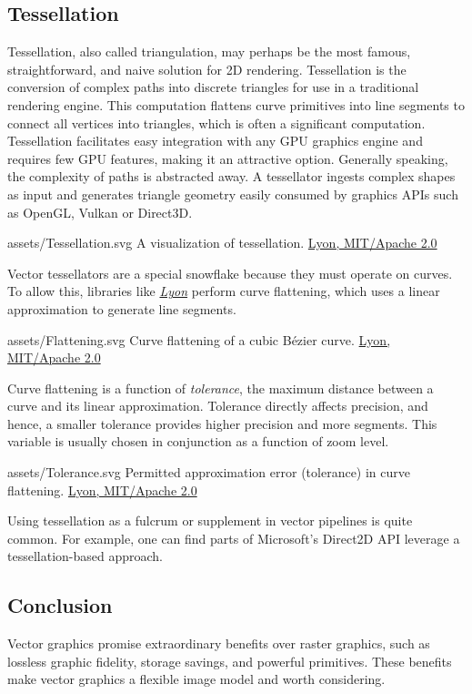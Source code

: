 \subsection{Tessellation}\label{sec:tessellation}
Tessellation, also called triangulation, may perhaps be the most famous, straightforward, and naive solution for 2D rendering. Tessellation is the conversion of complex paths into discrete triangles for use in a traditional rendering engine. This computation flattens curve primitives into line segments to connect all vertices into triangles, which is often a significant computation. Tessellation facilitates easy integration with any GPU graphics engine and requires few GPU features, making it an attractive option. Generally speaking, the complexity of paths is abstracted away. A tessellator ingests complex shapes as input and generates triangle geometry easily consumed by graphics APIs such as OpenGL, Vulkan or Direct3D.\medskip

\svg
{assets/Tessellation.svg}
{A visualization of tessellation.}
{\href{https://github.com/nical/lyon/blob/540a29c3726cdc79ffeb8a7ac3fbc793e63dc87b/crates/geom/src/lib.rs\#L24}{Lyon, MIT/Apache 2.0}}
\medskip

Vector tessellators are a special snowflake because they must operate on curves. To allow this, libraries like \href{https://github.com/nical/lyon}{\textit{Lyon}} perform curve flattening, which uses a linear approximation to generate line segments\cite{Silva18}.\medskip

\smallsvg
{assets/Flattening.svg}
{Curve flattening of a cubic Bézier curve.}
{\href{https://github.com/nical/lyon/blob/540a29c3726cdc79ffeb8a7ac3fbc793e63dc87b/crates/geom/src/lib.rs\#L24}{Lyon, MIT/Apache 2.0}}\medskip

Curve flattening is a function of \textit{tolerance}, the maximum distance between a curve and its linear approximation. Tolerance directly affects precision, and hence, a smaller tolerance provides higher precision and more segments. This variable is usually chosen in conjunction as a function of zoom level.\medskip

\widesvg
{assets/Tolerance.svg}
{Permitted approximation error (tolerance) in curve flattening.}
{\href{https://github.com/nical/lyon/blob/1c391badb70f8d5d23b45ecb4577f54a5c777122/crates/tessellation/src/lib.rs\#L10}{Lyon, MIT/Apache 2.0}}\medskip

Using tessellation as a fulcrum or supplement in vector pipelines is quite common. For example, one can find parts of Microsoft's Direct2D API\cite{D2D_Tess} leverage a tessellation-based approach.

\subsection{Conclusion}
Vector graphics promise extraordinary benefits over raster graphics, such as lossless graphic fidelity, storage savings, and powerful primitives. These benefits make vector graphics a flexible image model and worth considering.